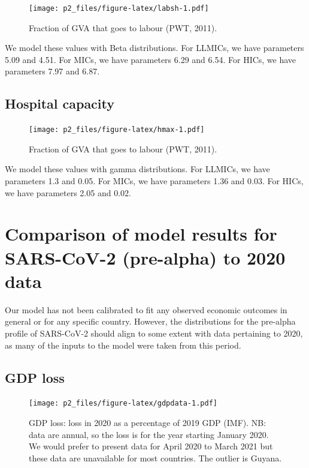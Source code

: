 \documentclass[
]{article}
\begin{document}
\begin{figure}
\centering
\texttt{[image: p2\_files/figure-latex/labsh-1.pdf]}
\caption{\label{fig:labsh}Fraction of GVA that goes to labour (PWT, 2011).}
\end{figure}

We model these values with Beta distributions. For LLMICs, we have parameters 5.09 and 4.51. For MICs, we have parameters 6.29 and 6.54. For HICs, we have parameters 7.97 and 6.87.

\newpage

\hypertarget{hospital-capacity}{%
\subsection{Hospital capacity}\label{hospital-capacity}}

\begin{figure}
\centering
\texttt{[image: p2\_files/figure-latex/hmax-1.pdf]}
\caption{\label{fig:hmax}Fraction of GVA that goes to labour (PWT, 2011).}
\end{figure}

We model these values with gamma distributions. For LLMICs, we have parameters 1.3 and 0.05. For MICs, we have parameters 1.36 and 0.03. For HICs, we have parameters 2.05 and 0.02.

\hypertarget{comparison-of-model-results-for-sars-cov-2-pre-alpha-to-2020-data}{%
\section{Comparison of model results for SARS-CoV-2 (pre-alpha) to 2020 data}\label{comparison-of-model-results-for-sars-cov-2-pre-alpha-to-2020-data}}

Our model has not been calibrated to fit any observed economic outcomes in general or for any specific country. However, the distributions for the pre-alpha profile of SARS-CoV-2 should align to some extent with data pertaining to 2020, as many of the inputs to the model were taken from this period.

\hypertarget{gdp-loss}{%
\subsection{GDP loss}\label{gdp-loss}}

\begin{figure}
\centering
\texttt{[image: p2\_files/figure-latex/gdpdata-1.pdf]}
\caption{\label{fig:gdpdata}GDP loss: loss in 2020 as a percentage of 2019 GDP (IMF). NB: data are annual, so the loss is for the year starting January 2020. We would prefer to present data for April 2020 to March 2021 but these data are unavailable for most countries. The outlier is Guyana.}
\end{figure}
\end{document}
